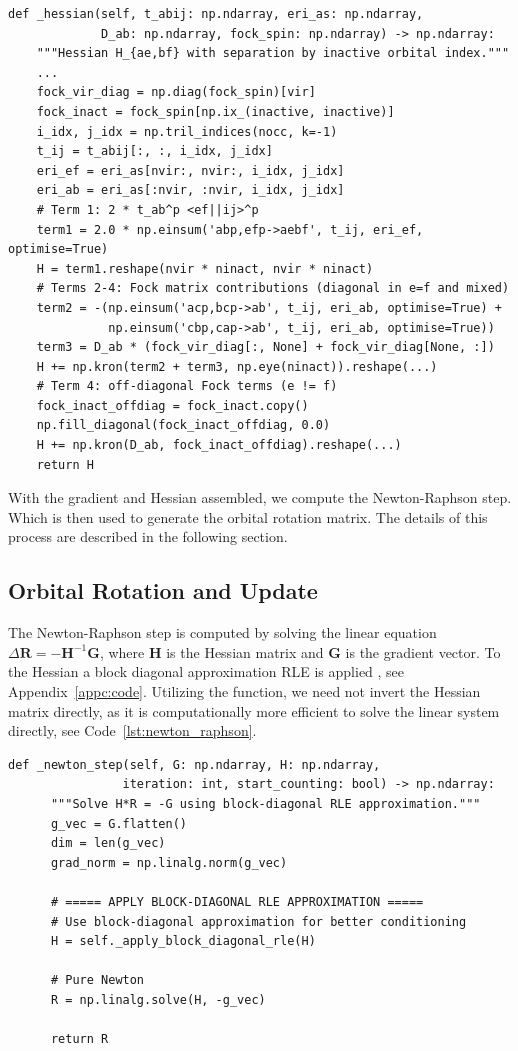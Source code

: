 \begin{lstlisting}[style=python, caption={Hessian computation with block structure}, label=lst:hessian]
def _hessian(self, t_abij: np.ndarray, eri_as: np.ndarray,
             D_ab: np.ndarray, fock_spin: np.ndarray) -> np.ndarray:
    """Hessian H_{ae,bf} with separation by inactive orbital index."""
    ...
    fock_vir_diag = np.diag(fock_spin)[vir]
    fock_inact = fock_spin[np.ix_(inactive, inactive)]
    i_idx, j_idx = np.tril_indices(nocc, k=-1)
    t_ij = t_abij[:, :, i_idx, j_idx]
    eri_ef = eri_as[nvir:, nvir:, i_idx, j_idx]
    eri_ab = eri_as[:nvir, :nvir, i_idx, j_idx]
    # Term 1: 2 * t_ab^p <ef||ij>^p
    term1 = 2.0 * np.einsum('abp,efp->aebf', t_ij, eri_ef, optimise=True)
    H = term1.reshape(nvir * ninact, nvir * ninact)
    # Terms 2-4: Fock matrix contributions (diagonal in e=f and mixed)
    term2 = -(np.einsum('acp,bcp->ab', t_ij, eri_ab, optimise=True) +
              np.einsum('cbp,cap->ab', t_ij, eri_ab, optimise=True))
    term3 = D_ab * (fock_vir_diag[:, None] + fock_vir_diag[None, :])
    H += np.kron(term2 + term3, np.eye(ninact)).reshape(...)
    # Term 4: off-diagonal Fock terms (e != f)
    fock_inact_offdiag = fock_inact.copy()
    np.fill_diagonal(fock_inact_offdiag, 0.0)
    H += np.kron(D_ab, fock_inact_offdiag).reshape(...)
    return H
\end{lstlisting}

With the gradient and Hessian assembled, we compute the Newton-Raphson step. Which is then used to generate the orbital rotation matrix. The details of this process are described in the following section.

\subsection{Orbital Rotation and Update}

The Newton-Raphson step is computed by solving the linear equation $\Delta\mathbf{R} = -\mathbf{H}^{-1}\mathbf{G}$, where $\mathbf{H}$ is the Hessian matrix and $\mathbf{G}$ is the gradient vector. To the Hessian a block diagonal approximation RLE is applied , see Appendix~\ref{appc:code}. Utilizing the  function, we need not invert the Hessian matrix directly, as it is computationally more efficient to solve the linear system directly, see Code~\ref{lst:newton_raphson}. 

\begin{lstlisting}[style=python, caption={Newton-Raphson step and orbital rotation}, label=lst:newton_raphson]
def _newton_step(self, G: np.ndarray, H: np.ndarray,
                iteration: int, start_counting: bool) -> np.ndarray:
      """Solve H*R = -G using block-diagonal RLE approximation."""
      g_vec = G.flatten()
      dim = len(g_vec)
      grad_norm = np.linalg.norm(g_vec)

      # ===== APPLY BLOCK-DIAGONAL RLE APPROXIMATION =====
      # Use block-diagonal approximation for better conditioning
      H = self._apply_block_diagonal_rle(H)

      # Pure Newton 
      R = np.linalg.solve(H, -g_vec)
  
      return R
\end{lstlisting}

